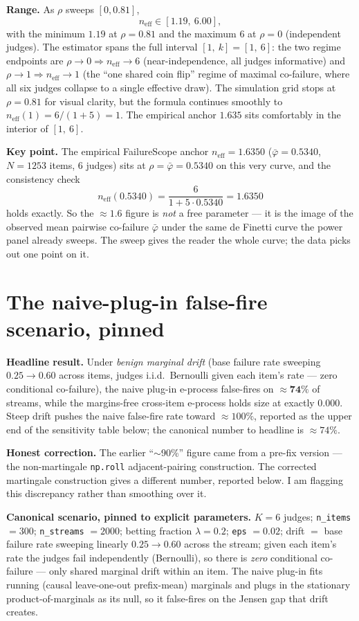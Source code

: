 \documentclass[11pt]{article}
\begin{document}
\textbf{Range.} As $\rho$ sweeps $[0, 0.81]$,
\[
  n_{\text{eff}} \in [1.19,\ 6.00],
\]
with the minimum $1.19$ at $\rho = 0.81$ and the maximum $6$ at $\rho = 0$
(independent judges). The estimator spans the full interval $[1,\ k] = [1,\ 6]$:
the two regime endpoints are $\rho \to 0 \Rightarrow n_{\text{eff}} \to 6$
(near-independence, all judges informative) and $\rho \to 1 \Rightarrow
n_{\text{eff}} \to 1$ (the ``one shared coin flip'' regime of maximal
co-failure, where all six judges collapse to a single effective draw). The
simulation grid stops at $\rho = 0.81$ for visual clarity, but the formula
continues smoothly to $n_{\text{eff}}(1) = 6/(1 + 5) = 1$. The empirical
anchor $1.635$ sits comfortably in the interior of $[1,\ 6]$.

\textbf{Key point.} The empirical FailureScope anchor
$n_{\text{eff}} = 1.6350$ ($\bar{\varphi} = 0.5340$, $N = 1253$ items, $6$
judges) sits at $\rho = \bar{\varphi} = 0.5340$ on this very curve, and the
consistency check
\[
  n_{\text{eff}}(0.5340) = \frac{6}{1 + 5 \cdot 0.5340} = 1.6350
\]
holds exactly. So the $\approx 1.6$ figure is \emph{not} a free parameter --- it
is the image of the observed mean pairwise co-failure $\bar{\varphi}$ under the
same de Finetti curve the power panel already sweeps. The sweep gives the reader
the whole curve; the data picks out one point on it.

\section{The naive-plug-in false-fire scenario, pinned}

\textbf{Headline result.} Under \emph{benign marginal drift} (base failure
rate sweeping $0.25 \to 0.60$ across items, judges i.i.d.\ Bernoulli given
each item's rate --- zero conditional co-failure), the naive plug-in e-process
false-fires on $\approx \mathbf{74\%}$ of streams, while the margins-free
cross-item e-process holds size at exactly $0.000$.  Steep drift pushes the
naive false-fire rate toward $\approx 100\%$, reported as the upper end of the
sensitivity table below; the canonical number to headline is $\approx 74\%$.

\textbf{Honest correction.} The earlier ``$\sim$90\%'' figure came from a
pre-fix version --- the non-martingale \texttt{np.roll} adjacent-pairing
construction. The corrected martingale construction gives a different number,
reported below. I am flagging this discrepancy rather than smoothing over it.

\textbf{Canonical scenario, pinned to explicit parameters.}
$K = 6$ judges; \texttt{n\_items} $= 300$; \texttt{n\_streams} $= 2000$;
betting fraction $\lambda = 0.2$; \texttt{eps} $= 0.02$; drift $=$ base failure
rate sweeping linearly $0.25 \to 0.60$ across the stream; given each item's rate
the judges fail independently (Bernoulli), so there is \emph{zero} conditional
co-failure --- only shared marginal drift within an item. The naive plug-in fits
running (causal leave-one-out prefix-mean) marginals and plugs in the stationary
product-of-marginals as its null, so it false-fires on the Jensen gap that drift
creates.
\end{document}
